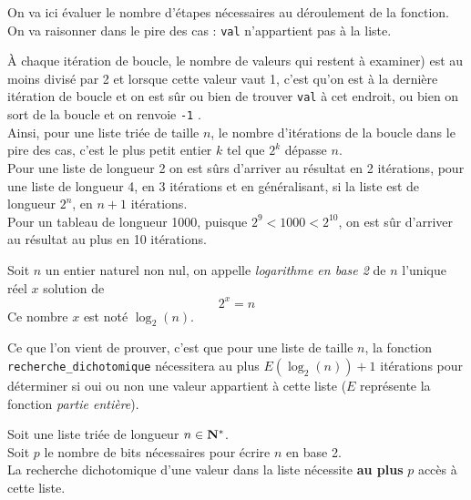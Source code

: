 On va ici évaluer le nombre d'étapes nécessaires au déroulement de la fonction. On va raisonner dans le pire des cas : \texttt{val} n'appartient pas à la liste.

À chaque itération de boucle, le nombre de valeurs qui restent à examiner) est au moins divisé par 2 et lorsque  cette valeur vaut 1, c'est qu'on est à la dernière itération de boucle et on est sûr ou bien de trouver \texttt{val} à cet endroit, ou bien on sort de la boucle et on renvoie \texttt{-1} .\\

Ainsi, pour une liste triée de taille $n$, le nombre d'itérations de la boucle dans le pire des cas, c'est le plus petit entier $k$ tel que $2^k$ dépasse $n$.\\

Pour une liste de longueur 2 on est sûrs d'arriver au résultat en 2 itérations, pour une liste de longueur 4, en 3 itérations et en généralisant, si la liste est de longueur $2^n$, en $n+1$ itérations.\\

Pour un tableau de longueur 1000, puisque $2^9<1000<2^{10}$, on est sûr d'arriver au résultat au plus en 10 itérations.\\

\begin{definition}[]
	Soit $n$ un entier naturel non nul, on appelle \textit{logarithme en base 2} de $n$ l'unique réel $x$ solution de $$2^x=n$$
	Ce nombre $x$ est noté $\log_2(n)$.

\end{definition}

Ce que l'on vient de prouver, c'est que pour une liste de taille $n$, la fonction\\
\texttt{recherche_dichotomique} nécessitera au plus $E (\log_2(n))+1$ itérations pour déterminer si oui ou non une valeur appartient à cette liste ($E$ représente la fonction \textit{partie entière}).\\

\begin{propriete}
	Soit une liste triée de longueur $n\in\mathbf{N}^*$.\\
	Soit $p$ le nombre de bits nécessaires pour écrire $n$ en base 2.\\

	La recherche dichotomique d'une valeur dans la liste nécessite \textbf{au plus} $p$ accès à cette liste.
\end{propriete}

